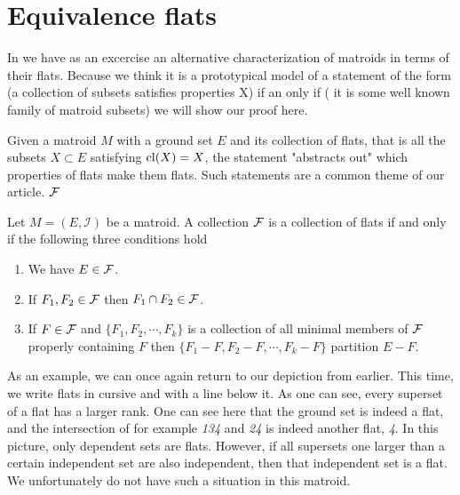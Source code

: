 \section{Equivalence flats}

In \cite[35]{oxley1} we have as an excercise an alternative characterization of matroids in terms of their flats. Because we think it is a prototypical model of a statement of the form (a collection of subsets satisfies properties X) if an only if ( it is some well known family of matroid subsets) we will show our proof here.

Given a matroid $M$ with a ground set $E$ and its collection of flats, that is all the subsets $X \subset E$ satisfying $\mathrm{cl}(X) = X$, the statement "abstracts out" which properties of flats make them flats. Such statements are a common theme of our article.
$\mathcal{F}$
\begin{theorem}
    Let $M = (E, \mathcal{I})$ be a matroid. A collection $\mathcal{F}$ is a collection of flats if and only if the following three conditions hold

    \begin{enumerate}
        \item We have $E \in \mathcal{F}$.
        \item If $F_1, F_2 \in \mathcal{F}$ then $F_1 \cap F_2 \in \mathcal{F}$.
        \item If $F \in \mathcal{F}$ and $\{F_1, F_2, \cdots, F_k\}$ is a collection of all minimal members of $\mathcal{F}$ properly containing $F$ then $\{F_1-F, F_2-F, \cdots, F_k - F\}$ partition $E-F$.
        
    \end{enumerate}
        
\end{theorem}

As an example, we can once again return to our depiction from earlier. This time, we write flats in cursive and with a line below it. As one can see, every superset of a flat has a larger rank. One can see here that the ground set is indeed a flat, and the intersection of for example \textit{134} and \textit{24} is indeed another flat, \textit{4}. In this picture, only dependent sets are flats. However, if all supersets one larger than a certain independent set are also independent, then that independent set is a flat. We unfortunately do not have such a situation in this matroid. 

